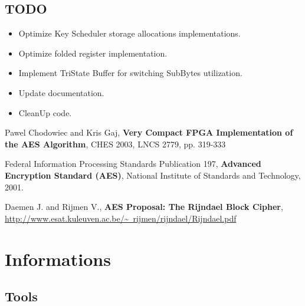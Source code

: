 \documentclass[a4paper,12pt]{report}
\begin{document}
\section{TODO}

\begin{itemize}
\item Optimize Key Scheduler storage allocations implementations.
\item Optimize folded register implementation.
\item Implement TriState Buffer for switching SubBytes utilization.
\item Update documentation.
\item CleanUp code.
\end{itemize}

\begin{thebibliography}{1}

Pawel Chodowiec and Kris Gaj, \textbf{Very Compact FPGA Implementation
of the AES Algorithm}, CHES 2003, LNCS 2779, pp. 319-333

Federal Information Processing Standards Publication 197,
\textbf{Advanced Encryption Standard (AES)}, National Institute of
Standards and Technology, 2001.

Daemen J. and Rijmen V., \textbf{AES Proposal: The Rijndael Block Cipher},\\
\href{http://www.esat.kuleuven.ac.be/~rijmen/rijndael/Rijndael.pdf}{http://www.esat.kuleuven.ac.be/\~~rijmen/rijndael/Rijndael.pdf}


\end{thebibliography}

\appendix

\chapter{Informations}

\section{Tools}
\end{document}
